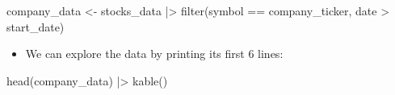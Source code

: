 \documentclass[
  12pt]{article}
\newenvironment{Shaded}{\begin{snugshade}}{\end{snugshade}}
\newcommand{\FunctionTok}[1]{\textcolor[rgb]{0.28,0.35,0.67}{#1}}
\newcommand{\NormalTok}[1]{\textcolor[rgb]{0.00,0.23,0.31}{#1}}
\newcommand{\OtherTok}[1]{\textcolor[rgb]{0.00,0.23,0.31}{#1}}
\newcommand{\SpecialCharTok}[1]{\textcolor[rgb]{0.37,0.37,0.37}{#1}}
\providecommand{\tightlist}{%
  \setlength{\itemsep}{0pt}\setlength{\parskip}{0pt}}\usepackage{longtable,booktabs,array}
\theoremstyle{definition}
\theoremstyle{remark}
\begin{document}
\begin{Shaded}
\begin{Highlighting}[]
\NormalTok{company\_data }\OtherTok{\textless{}{-}} 
\NormalTok{  stocks\_data }\SpecialCharTok{|\textgreater{}} 
  \FunctionTok{filter}\NormalTok{(symbol }\SpecialCharTok{==}\NormalTok{ company\_ticker, }
\NormalTok{         date }\SpecialCharTok{\textgreater{}}\NormalTok{ start\_date) }
\end{Highlighting}
\end{Shaded}

\begin{itemize}
\tightlist
\item
  We can explore the data by printing its first 6 lines:
\end{itemize}

\begin{Shaded}
\begin{Highlighting}[]
\FunctionTok{head}\NormalTok{(company\_data) }\SpecialCharTok{|\textgreater{}} 
  \FunctionTok{kable}\NormalTok{()}
\end{Highlighting}
\end{Shaded}
\end{document}
